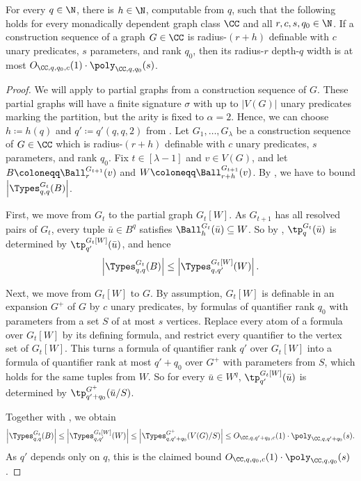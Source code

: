 \begin{lemma}\label{lem:skel-def-to-types}
  For every $q\in\N$, there is $h\in\N$, computable from $q$, such that the following holds for every monadically dependent graph class $\CC$ and all $r,c,s,q_0\in\N$.
  If a construction sequence of a graph $G\in\CC$ is radius-$(r+h)$ definable with $c$ unary predicates, $s$ parameters, and rank $q_0$,
  then its radius-$r$ depth-$q$ width is at most $O_{\CC,q,q_0,c}(1)\cdot\poly_{\CC,q,q_0}(s)$.
\end{lemma}
\begin{proof}
  We will apply  to partial graphs from a construction sequence of $G$.
  These partial graphs will have a finite signature $\sigma$ with up to $|V(G)|$ unary predicates marking the partition, but the arity is fixed to $\alpha=2$.
  Hence, we can choose $h\coloneqq h(q)$ and $q'\coloneqq q'(q,q,2)$ from .
  Let $G_1,\ldots,G_\lambda$ be a construction sequence of $G\in\CC$ which is radius-$(r+h)$ definable with $c$ unary predicates, $s$ parameters, and rank $q_0$.
  Fix $t\in[\lambda-1]$ and $v\in V(G)$, and let $B\coloneqq\Ball^{G_{t+1}}_r(v)$ and $W\coloneqq\Ball^{G_{t+1}}_{r+h}(v)$.
  By , we have to bound $\left|\Types^{G_t}_{q,q}(B)\right|$.

  First, we move from $G_t$ to the partial graph $G_t[W]$.
  As $G_{t+1}$ has all resolved pairs of $G_t$, every tuple $\bar u\in B^q$ satisfies $\Ball^{G_t}_h(\bar u)\subseteq W$.
  So by , $\tp^{G_t}_q(\bar u)$ is determined by $\tp^{G_t[W]}_{q'}(\bar u)$, and hence
  \[
    \left|\Types^{G_t}_{q,q}(B)\right|
    \le\left|\Types^{G_t[W]}_{q,q'}(W)\right|.
  \]

  Next, we move from $G_t[W]$ to $G$.
  By assumption, $G_t[W]$ is definable in an expansion $G^+$ of $G$ by $c$ unary predicates, by formulas of quantifier rank $q_0$ with parameters from a set $S$ of at most $s$ vertices.
  Replace every atom of a formula over $G_t[W]$ by its defining formula, and restrict every quantifier to the vertex set of $G_t[W]$.
  This turns a formula of quantifier rank $q'$ over $G_t[W]$ into a formula of quantifier rank at most $q'+q_0$ over $G^+$ with parameters from $S$,
  which holds for the same tuples from $W$.
  So for every $\bar u\in W^q$, $\tp^{G_t[W]}_{q'}(\bar u)$ is determined by $\tp^{G^+}_{q'+q_0}(\bar u/S)$.

  Together with , we obtain
  \[
    \left|\Types^{G_t}_{q,q}(B)\right|
    \le\left|\Types^{G_t[W]}_{q,q'}(W)\right|
    \le\left|\Types^{G^+}_{q,q'+q_0}(V(G)/S)\right|
    \le O_{\CC,q,q'+q_0,c}(1)\cdot\poly_{\CC,q,q'+q_0}(s).
  \]
  As $q'$ depends only on $q$, this is the claimed bound $O_{\CC,q,q_0,c}(1)\cdot\poly_{\CC,q,q_0}(s)$.
\end{proof}

